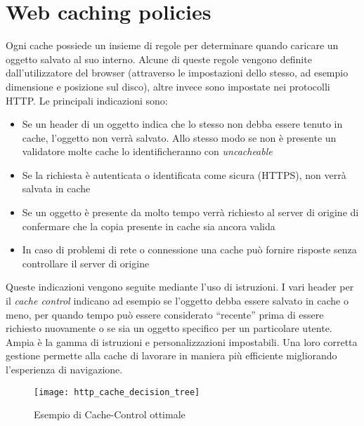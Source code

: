 \section{Web caching policies}

Ogni cache possiede un insieme di regole per determinare quando caricare un oggetto salvato al suo interno. Alcune di queste regole vengono definite dall'utilizzatore del browser (attraverso le impostazioni dello stesso, ad esempio dimensione e posizione sul disco), altre invece sono impostate nei protocolli HTTP.
Le principali indicazioni sono:

\begin{itemize}
	
	\item{Se un header di un oggetto indica che lo stesso non debba essere tenuto in cache, l'oggetto non verrà salvato. Allo stesso modo se non è presente un validatore molte cache lo identificheranno con \textit{uncacheable}}
	
	\item{Se la richiesta è autenticata o identificata come sicura (HTTPS), non verrà salvata in cache}
	
	\item{Se un oggetto è presente da molto tempo verrà richiesto al server di origine di confermare che la copia presente in cache sia ancora valida}
	
	\item{In caso di problemi di rete o connessione una cache può fornire risposte senza controllare il server di origine} 
	
\end{itemize}

Queste indicazioni vengono seguite mediante l'uso di istruzioni. I vari header per il \textit{cache control} indicano ad esempio se l'oggetto debba essere salvato in cache o meno, per quando tempo può essere considerato ``recente'' prima di essere richiesto nuovamente o se sia un oggetto specifico per un particolare utente. Ampia è la gamma di istruzioni e personalizzazioni impostabili. Una loro corretta gestione permette alla cache di lavorare in maniera più efficiente migliorando l'esperienza di navigazione.

\begin{figure}[htpb]
	\begin{center}
		\texttt{[image: http\_cache\_decision\_tree]}
	\end{center}
	\caption[Esempio di Cache-Control ottimale]{Esempio di Cache-Control ottimale\footnotemark}
\end{figure}

